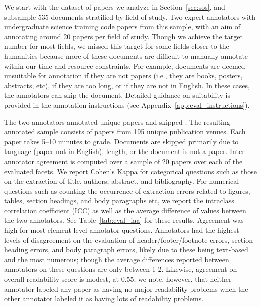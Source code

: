 We start with the dataset of \numpdfs papers we analyze in Section~\ref{sec:sos},
and subsample 535 documents stratified by field of study. Two expert annotators with undergraduate science training code papers from this sample, with an aim of annotating around 20 papers per field of study. Though we achieve the target number for most fields, we missed this target for some fields closer to the humanities because more of these documents are difficult to manually annotate within our time and resource constraints.
For example, documents are deemed unsuitable for annotation if they are not papers (i.e., they are books, posters, abstracts, etc), if they are too long, or if they are not in English. In these cases, the annotators can skip the document. Detailed guidance on suitability is provided in the annotation instructions (see Appendix~\ref{app:eval_instructions}). 

The two annotators annotated \numeval unique papers and skipped \numevalskipped. The resulting annotated sample consists of papers from 195 unique publication venues. Each paper takes 5--10 minutes to grade. Documents are skipped primarily due to language (paper not in English), length, or the document is not a paper. Inter-annotator agreement is computed over a sample of 20 papers over each of the evaluated facets. We report Cohen's Kappa for categorical questions such as those on the extraction of title, authors, abstract, and bibliography. For numerical questions such as counting the occurrence of extraction errors related to figures, tables, section headings, and body paragraphs etc, we report the intraclass correlation coefficient (ICC) as well as the average difference of values between the two annotators. See Table~\ref{tab:eval_iaa} for these results.
Agreement was high for most element-level annotator questions. Annotators had the highest levels of disagreement on the evaluation of header/footer/footnote errors, section heading errors, and body paragraph errors, likely due to these being text-based and the most numerous; though the average differences reported between annotators on these questions are only between 1-2. Likewise, agreement on overall readability score is modest, at 0.55; we note, however, that neither annotator labeled any paper as having no major readability problems when the other annotator labeled it as having lots of readability problems.


